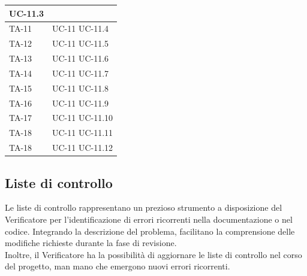 \documentclass[8pt]{article}
\begin{document}
\begin{longtable}{|>{\centering}p{4cm}|>{\centering\arraybackslash}p{4cm}|}
            UC-11.3
    \\
    \hline
    TA-11 & UC-11 \newline
            UC-11.4
    \\
    \hline
    TA-12 & UC-11 \newline
            UC-11.5
    \\
    \hline
    TA-13 & UC-11 \newline
            UC-11.6
    \\
    \hline
    TA-14 & UC-11 \newline
            UC-11.7
    \\
    \hline
    TA-15 & UC-11 \newline
            UC-11.8
    \\
    \hline
    TA-16 & UC-11 \newline
            UC-11.9
    \\
    \hline
    TA-17 & UC-11 \newline
            UC-11.10
    \\
    \hline
    TA-18 & UC-11 \newline
            UC-11.11
    \\
    \hline
    TA-18 & UC-11 \newline
            UC-11.12
    \\
    \hline
\end{longtable}
\clearpage
\subsection{Liste di controllo}\label{sec:liste controllo}
Le liste di controllo rappresentano un prezioso strumento a disposizione del
Verificatore per l'identificazione di errori ricorrenti nella documentazione o nel codice. Integrando la descrizione del problema, facilitano la comprensione delle modifiche richieste durante la fase di revisione.
\\
Inoltre, il Verificatore ha la possibilità di aggiornare le liste di controllo nel corso del progetto, man mano che emergono nuovi errori ricorrenti.
\end{document}
